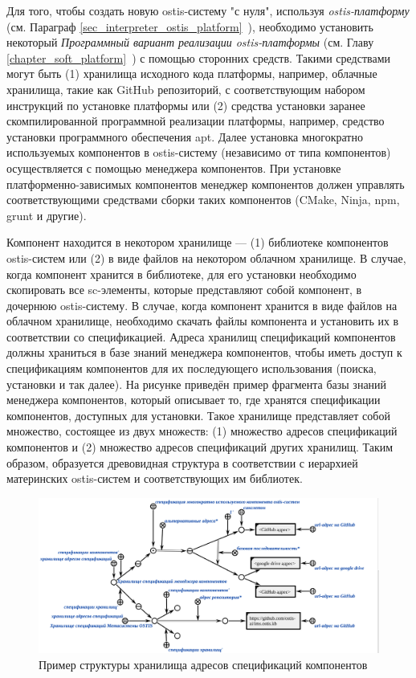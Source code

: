 Для того, чтобы создать новую ostis-систему "с нуля"{}, используя \textit{ostis-платформу} (см. Параграф \ref{sec_interpreter_ostis_platform}~), необходимо установить некоторый \textit{Программный вариант реализации ostis-платформы} (см. Главу \ref{chapter_soft_platform}~) с помощью сторонних средств. Такими средствами могут быть (1) хранилища исходного кода платформы, например, облачные хранилища, такие как GitHub репозиторий, с соответствующим набором инструкций по установке платформы или (2) средства установки заранее скомпилированной программной реализации платформы, например, средство установки программного обеспечения apt. Далее установка многократно используемых компонентов в ostis-систему (независимо от типа компонентов) осуществляется с помощью менеджера компонентов. При установке платформенно-зависимых компонентов менеджер компонентов должен управлять соответствующими средствами сборки таких компонентов (CMake, Ninja, npm, grunt и другие).

Компонент находится в некотором хранилище --- (1) библиотеке компонентов ostis-систем или (2) в виде файлов на некотором облачном хранилище. В случае, когда компонент хранится в библиотеке, для его установки необходимо скопировать все sc-элементы, которые представляют собой компонент, в дочернюю ostis-систему. В случае, когда компонент хранится в виде файлов на облачном хранилище, необходимо скачать файлы компонента и установить их в соответствии со спецификацией. Адреса хранилищ спецификаций компонентов должны храниться в базе знаний менеджера компонентов, чтобы иметь доступ к спецификациям компонентов для их последующего использования (поиска, установки и так далее). На рисунке  приведён пример фрагмента базы знаний менеджера компонентов, который описывает то, где хранятся спецификации компонентов, доступных для установки. Такое хранилище представляет собой множество, состоящее из двух множеств: (1) множество адресов спецификаций компонентов и (2) множество адресов спецификаций других хранилищ. Таким образом, образуется древовидная структура в соответствии с иерархией материнских ostis-систем и соответствующих им библиотек.

\begin{figure}[H]
	\includegraphics[scale=0.5]{author/part5/figures/specification_storage_addresses.png}
	\caption{Пример структуры хранилища адресов спецификаций компонентов}
	\label{fig:specification_storage_addresses}
\end{figure}

